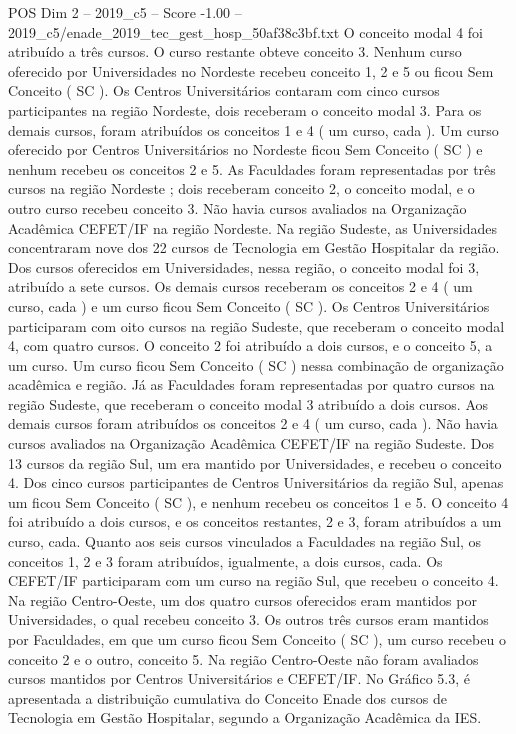 \begin{textsample}{POS Dim 2 – 2019\_c5 – Score -1.00 – 2019\_c5/enade\_2019\_tec\_gest\_hosp\_50af38c3bf.txt}
O conceito modal 4 foi atribuído a três cursos.
O curso restante obteve conceito 3.
Nenhum curso oferecido por Universidades no Nordeste recebeu conceito 1, 2 e 5 ou ficou Sem Conceito ( SC ).
Os Centros Universitários contaram com cinco cursos participantes na região Nordeste, dois receberam o conceito modal 3.
Para os demais cursos, foram atribuídos os conceitos 1 e 4 ( um curso, cada ).
Um curso oferecido por Centros Universitários no Nordeste ficou Sem Conceito ( SC ) e nenhum recebeu os conceitos 2 e 5.
As Faculdades foram representadas por três cursos na região Nordeste ; dois receberam conceito 2, o conceito modal, e o outro curso recebeu conceito 3.
Não havia cursos avaliados na Organização Acadêmica CEFET/IF na região Nordeste.
Na região Sudeste, as Universidades concentraram nove dos 22 cursos de Tecnologia em Gestão Hospitalar da região.
Dos cursos oferecidos em Universidades, nessa região, o conceito modal foi 3, atribuído a sete cursos.
Os demais cursos receberam os conceitos 2 e 4 ( um curso, cada ) e um curso ficou Sem Conceito ( SC ).
Os Centros Universitários participaram com oito cursos na região Sudeste, que receberam o conceito modal 4, com quatro cursos.
O conceito 2 foi atribuído a dois cursos, e o conceito 5, a um curso.
Um curso ficou Sem Conceito ( SC ) nessa combinação de organização acadêmica e região.
Já as Faculdades foram representadas por quatro cursos na região Sudeste, que receberam o conceito modal 3 atribuído a dois cursos.
Aos demais cursos foram atribuídos os conceitos 2 e 4 ( um curso, cada ).
Não havia cursos avaliados na Organização Acadêmica CEFET/IF na região Sudeste.
Dos 13 cursos da região Sul, um era mantido por Universidades, e recebeu o conceito 4.
Dos cinco cursos participantes de Centros Universitários da região Sul, apenas um ficou Sem Conceito ( SC ), e nenhum recebeu os conceitos 1 e 5.
O conceito 4 foi atribuído a dois cursos, e os conceitos restantes, 2 e 3, foram atribuídos a um curso, cada.
Quanto aos seis cursos vinculados a Faculdades na região Sul, os conceitos 1, 2 e 3 foram atribuídos, igualmente, a dois cursos, cada.
Os CEFET/IF participaram com um curso na região Sul, que recebeu o conceito 4.
Na região Centro-Oeste, um dos quatro cursos oferecidos eram mantidos por Universidades, o qual recebeu conceito 3.
Os outros três cursos eram mantidos por Faculdades, em que um curso ficou Sem Conceito ( SC ), um curso recebeu o conceito 2 e o outro, conceito 5.
Na região Centro-Oeste não foram avaliados cursos mantidos por Centros Universitários e CEFET/IF.
No Gráfico 5.3, é apresentada a distribuição cumulativa do Conceito Enade dos cursos de Tecnologia em Gestão Hospitalar, segundo a Organização Acadêmica da IES.

\end{textsample}
